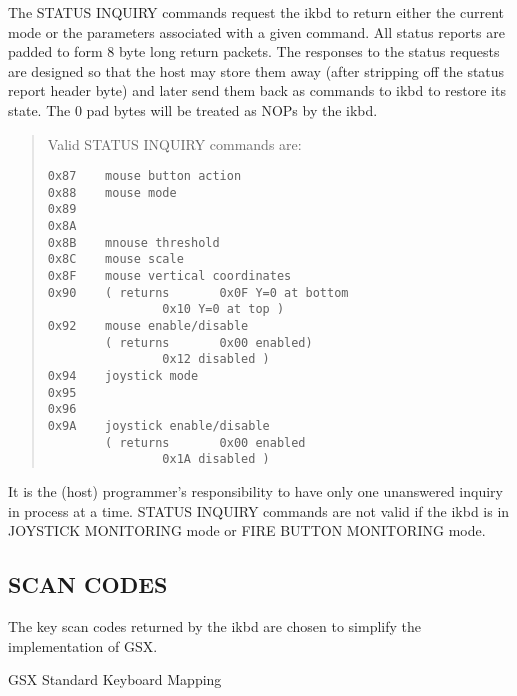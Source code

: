 \documentclass[a4paper,8pt,english]{sphinxmanual}
\begin{document}
The STATUS INQUIRY commands request the ikbd to return either the current mode
or the parameters associated with a given command. All status reports are
padded to form 8 byte long return packets. The responses to the status
requests are designed so that the host may store them away (after stripping
off the status report header byte) and later send them back as commands to
ikbd to restore its state. The 0 pad bytes will be treated as NOPs by the
ikbd.
\begin{quote}

Valid STATUS INQUIRY commands are:

\begin{Verbatim}[commandchars=\\\{\}]
0x87    mouse button action
0x88    mouse mode
0x89
0x8A
0x8B    mnouse threshold
0x8C    mouse scale
0x8F    mouse vertical coordinates
0x90    ( returns       0x0F Y=0 at bottom
                0x10 Y=0 at top )
0x92    mouse enable/disable
        ( returns       0x00 enabled)
                0x12 disabled )
0x94    joystick mode
0x95
0x96
0x9A    joystick enable/disable
        ( returns       0x00 enabled
                0x1A disabled )
\end{Verbatim}
\end{quote}

It is the (host) programmer's responsibility to have only one unanswered
inquiry in process at a time.
STATUS INQUIRY commands are not valid if the ikbd is in JOYSTICK MONITORING
mode or FIRE BUTTON MONITORING mode.


\subsection{SCAN CODES}
\label{input/devices/atarikbd:scan-codes}
The key scan codes returned by the ikbd are chosen to simplify the
implementation of GSX.

GSX Standard Keyboard Mapping
\end{document}
